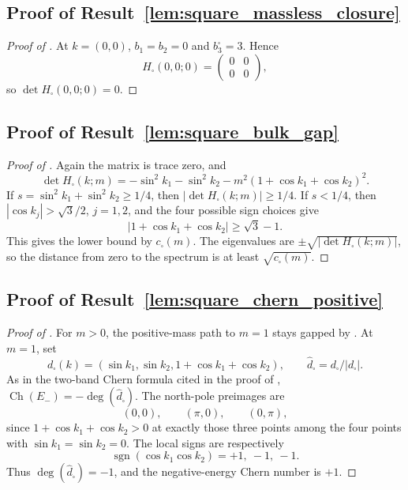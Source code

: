 \documentclass[11pt]{article}
\numberwithin{equation}{section}
\theoremstyle{definition}
\theoremstyle{remark}
\newcommand{\Ch}{\operatorname{Ch}}
\begin{document}
\subsection{Proof of Result~\ref{lem:square_massless_closure}}\label{app:proof:lem:square_massless_closure}
\begin{proof}[Proof of ]
At \(k=(0,0)\), \(b_1=b_2=0\) and \(b_3^{\square}=3\). Hence
\[
H_{\square}(0,0;0)=
\begin{pmatrix}
0&0\\
0&0
\end{pmatrix},
\]
so \(\det H_{\square}(0,0;0)=0\).
\end{proof}

\subsection{Proof of Result~\ref{lem:square_bulk_gap}}\label{app:proof:lem:square_bulk_gap}
\begin{proof}[Proof of ]
Again the matrix is trace zero, and
\[
\det H_{\square}(k;m)
=-\sin^2 k_1-\sin^2 k_2-m^2(1+\cos k_1+\cos k_2)^2 .
\]
If \(s=\sin^2k_1+\sin^2k_2\ge1/4\), then
\(|\det H_{\square}(k;m)|\ge1/4\). If \(s<1/4\), then
\(|\cos k_j|>\sqrt3/2\), \(j=1,2\), and the four possible sign choices give
\[
|1+\cos k_1+\cos k_2|\ge\sqrt{3}-1 .
\]
This gives the lower bound by \(c_{\square}(m)\). The eigenvalues are
\(\pm\sqrt{|\det H_{\square}(k;m)|}\), so the distance from zero to the spectrum is at least
\(\sqrt{c_{\square}(m)}\).
\end{proof}

\subsection{Proof of Result~\ref{lem:square_chern_positive}}\label{app:proof:lem:square_chern_positive}
\begin{proof}[Proof of ]
For \(m>0\), the positive-mass path to \(m=1\) stays gapped by . At
\(m=1\), set
\[
d_{\square}(k)=(\sin k_1,\sin k_2,1+\cos k_1+\cos k_2),\qquad
\widehat d_{\square}=d_{\square}/|d_{\square}|.
\]
As in the two-band Chern formula cited in the proof of ,
\(\Ch(E_-)=-\deg(\widehat d_{\square})\). The north-pole preimages are
\[
(0,0),\qquad(\pi,0),\qquad(0,\pi),
\]
since \(1+\cos k_1+\cos k_2>0\) at exactly those three points among the four points with
\(\sin k_1=\sin k_2=0\). The local signs are respectively
\[
\operatorname{sgn}(\cos k_1\cos k_2)=+1,\ -1,\ -1 .
\]
Thus \(\deg(\widehat d_{\square})=-1\), and the negative-energy Chern number is \(+1\).
\end{proof}
\end{document}
